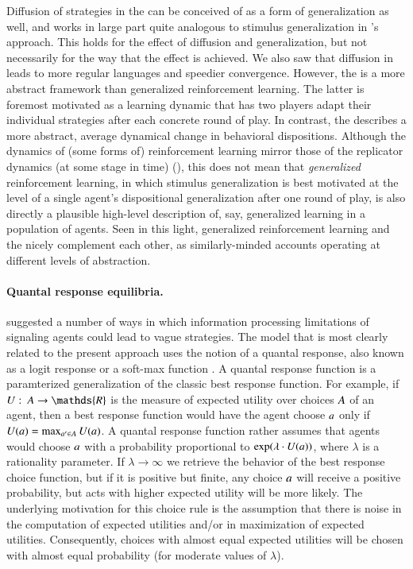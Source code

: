 Diffusion of strategies in the \rdd can be conceived of as a form of
generalization as well, and works in large part quite analogous to
stimulus generalization in \citeauthor{OConnor2013:The-Evolution-o}'s
approach. This holds for the effect of diffusion and generalization,
but not necessarily for the way that the effect is achieved. We also
saw that diffusion in \rdd leads to more regular languages and
speedier convergence. However, the \rdd is a more abstract framework
than generalized reinforcement learning. The latter is foremost
motivated as a learning dynamic that has two players adapt their
individual strategies after each concrete round of play. In contrast,
the \rdd describes a more abstract, average dynamical change in
behavioral dispositions. Although the dynamics of (some forms of)
reinforcement learning mirror those of the replicator dynamics (at
some stage in time)
(\cite{BorgersSarin997:Learning-Throug,HopkinsPosch2005:Attainability-o,Beggs2005:On-the-Converge}),
this does not mean that \emph{generalized} reinforcement learning, in
which stimulus generalization is best motivated at the level of a
single agent's dispositional generalization after one round of play,
is also directly a plausible high-level description of, say,
generalized learning in a population of agents. Seen in this light,
generalized reinforcement learning and the \rdd nicely complement each
other, as similarly-minded accounts operating at different levels of
abstraction.

\paragraph{Quantal response equilibria.}
\citet{FrankeJager2010:Vagueness-Signa} suggested a number of ways in
which information processing limitations of signaling agents could
lead to vague strategies. The model that is most clearly related to
the present approach uses the notion of a quantal response, also known
as a logit response or a soft-max function
\citep[e.g.][]{Luce1959:Individual-Choi,McFadden1976:Quantal-Choice-,McKelveyPalfrey1995:Quantal-Respons,McKelveyPalfrey1998:Quantal-Respons,GoereeHolt2008:Quantal-Respons}. A
quantal response function is a paramterized generalization of the
classic best response function. For example, if $U \mycolon \Acts
\rightarrow \mathds{R}$ is the measure of expected utility over
choices $A$ of an agent, then a best response function would have
the agent choose $a$ only if $U(a) = \max_{a' \in A}
U(a)$. A quantal response function rather assumes that agents would
choose $a$ with a probability proportional to $\operatorname{exp}(\lambda \cdot
U(a))$, where $\lambda$ is a rationality parameter. If $\lambda
\rightarrow \infty$ we retrieve the behavior of the best response
choice function, but if it is positive but finite, any choice $a$
will receive a positive probability, but acts with higher expected
utility will be more likely. The underlying motivation for this choice
rule is the assumption that there is noise in the computation of
expected utilities and/or in maximization of expected
utilities. Consequently, choices with almost equal expected utilities
will be chosen with almost equal probability (for moderate values of
$\lambda$). 

